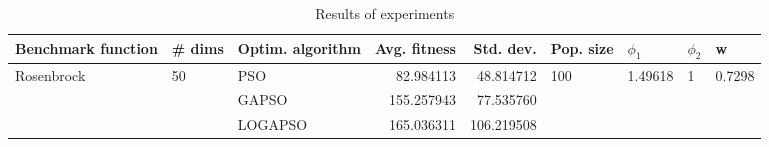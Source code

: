 \begin{table}
\centering
\caption{Results of experiments}
\begin{tabular}{lllrrllll}
\toprule
         Benchmark function &             \# dims & Optim. algorithm &  Avg. fitness &  Std. dev. &            Pop. size &               $\phi_{1}$ &         $\phi_{2}$ &                       w \\
\midrule
\multirow{3}{*}{Rosenbrock} & \multirow{3}{*}{50} &              PSO &     82.984113 &  48.814712 & \multirow{3}{*}{100} & \multirow{3}{*}{1.49618} & \multirow{3}{*}{1} & \multirow{3}{*}{0.7298} \\
                            &                     &            GAPSO &    155.257943 &  77.535760 &                      &                          &                    &                         \\
                            &                     &          LOGAPSO &    165.036311 & 106.219508 &                      &                          &                    &                         \\
\bottomrule
\end{tabular}
\end{table}
